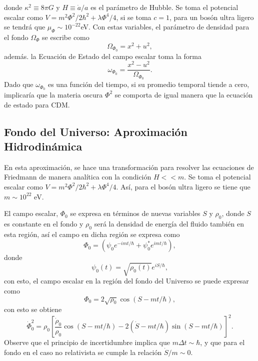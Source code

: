 \documentclass[a4paper,openright,12pt]{book}
\begin{document}
donde $\kappa^{2}\equiv 8\pi G$ y $H \equiv \dot{a}/a$ es el parámetro de Hubble. Se toma el potencial escalar como $V = m^{2}\Phi^{2}/2\hbar^{2} + \lambda\Phi^{4}/4$, si se toma $c = 1$, para un bosón ultra ligero se tendrá que $\mu_{\Phi} \sim 10^{-22} $eV. Con estas variables, el parámetro de densidad para el fondo $\Omega_{\Phi}$ se escribe como
\begin{equation}
\Omega_{\Phi_{0}}= x^{2}+u^{2},\label{eqn 1.58}
\end{equation}
además. la Ecuación de Estado del campo escalar toma la forma
\begin{equation}
\omega_{\Phi_{0}}= \frac{x^{2}-u ^{2}}{\Omega_{\Phi_{0}}}.\label{eqn 1.59}
\end{equation}
Dado que $\omega_{\Phi_{0}}$ es una función del tiempo, si su promedio temporal tiende a cero, implicaría que la materia oscura $\Phi^{2}$ se comporta de igual manera que la ecuación de estado para CDM.
\subsection{Fondo del Universo: Aproximación Hidrodinámica}
En esta aproximación, se hace una transformación para resolver las ecuaciones de Friedmann de manera analítica con la condición $H<<m$. Se toma el potencial escalar como $V = m^{2}\Phi^{2}/2\hbar^{2} + \lambda\Phi^{4}/4$. Así, para el bosón ultra ligero se tiene que $m \sim 10^{22}$ eV.

El campo escalar, $\Phi_{0}$ se expresa en términos de nuevas variables $S$ y $\rho_{0}$, donde $S$ es constante en el fondo y $\rho_{0}$ será la densidad de energía del fluido también en esta región, así el campo en dicha región se expresa como
\begin{equation}
\Phi_{0} = (\psi_{0}e^{-imt/\hbar} + \psi_{0}^{*}e^{imt/\hbar}),\label{eqn 1.60}
\end{equation}
donde
\begin{equation}
\psi_{0}(t) = \sqrt{\rho_{0}(t)}e^{iS/\hbar},\label{eqn 1.61}
\end{equation}
con esto, el campo escalar en la región del fondo del Universo se puede expresar como 
\begin{equation}
\Phi_{0}=2\sqrt{\rho_{0}}\cos(S-mt/\hbar),\label{eqn 1.62}
\end{equation}
con esto se obtiene
\begin{equation}
\dot{\Phi}_{0}^{2} = \rho_{0} 
\left[
\frac{\dot{\rho}_{0}}{\rho_{0}}\cos(S-mt/\hbar) 
- 2(\dot{S}-mt/\hbar)\sin(S-mt/\hbar)
\right]^{2}.\label{eqn 1.63}
\end{equation}
Observe que el principio de incertidumbre implica que $m \Delta t \sim \hbar$, y que para el fondo en el caso no relativista se cumple la relación $\dot{S}/m \sim 0$. 
\end{document}
